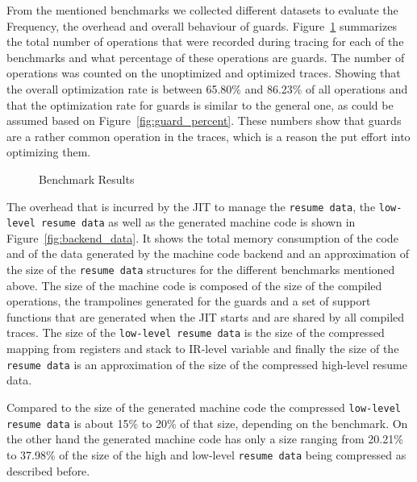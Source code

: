 \documentclass[10pt,preprint]{sigplanconf}
\begin{document}
From the mentioned benchmarks we collected different datasets to evaluate the
Frequency, the overhead and overall behaviour of guards.
Figure~\ref{fig:benchmarks} summarizes the total number of operations that were
recorded during tracing for each of the benchmarks and what percentage of these
operations are guards. The number of operations was counted on the unoptimized
and optimized traces. Showing that the overall optimization rate is between
65.80\% and 86.23\% of all operations and that the optimization rate for guards
is similar to the general one, as could be assumed based on
Figure~\ref{fig:guard_percent}. These numbers show that guards are a rather
common operation in the traces, which is a reason the put effort into
optimizing them.

\begin{figure}
    
    \caption{Benchmark Results}
    \label{fig:benchmarks}
\end{figure}


The overhead that is incurred by the JIT to manage the \texttt{resume data},
the \texttt{low-level resume data} as well as the generated machine code is
shown in Figure~\ref{fig:backend_data}. It shows the total memory consumption
of the code and of the data generated by the machine code backend and an
approximation of the size of the \texttt{resume data} structures for the
different benchmarks mentioned above. The size of the machine code is composed
of the size of the compiled operations, the trampolines generated for the
guards and a set of support functions that are generated when the JIT starts
and are shared by all compiled traces. The size of the \texttt{low-level resume
data} is the size of the compressed mapping from registers and stack to
IR-level variable and finally the size of the \texttt{resume data} is an
approximation of the size of the compressed high-level resume data.

Compared to the size of the generated machine code the compressed
\texttt{low-level resume data} is about 15\% to 20\% of that size, depending on
the benchmark. On the other hand the generated machine code has only a size
ranging from 20.21\% to 37.98\% of the size of the high and low-level
\texttt{resume data} being compressed as described before.
\end{document}
